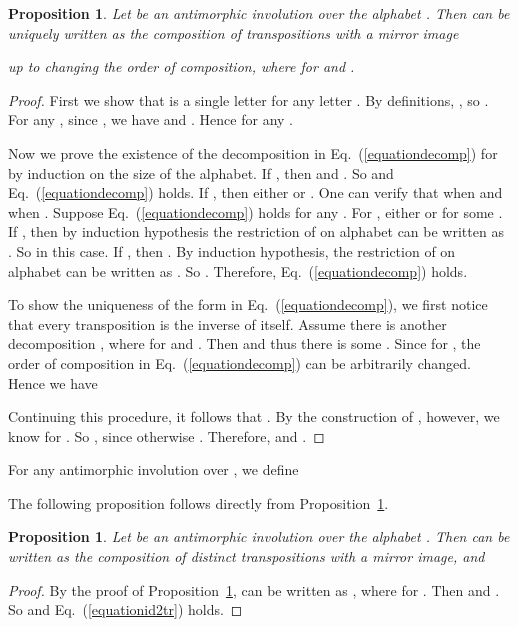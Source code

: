\documentclass[12pt]{article}
\newtheorem{proposition}[theorem]{Proposition}
\begin{document}
\begin{proposition}\label{prop:decomposition}
Let  be an antimorphic involution over the alphabet
. Then  can be uniquely written as the composition
of transpositions with a mirror image

up to changing the order of composition, where  for
 and .
\end{proposition}
\begin{proof}
First we show that  is a single letter for any letter
. By definitions, , so . For
any , since , we have
 and . Hence
 for any .

Now we prove the existence of the decomposition in
Eq.~(\ref{equationdecomp}) for  by induction on the size of
the alphabet. If , then  and
. So  and
Eq.~(\ref{equationdecomp}) holds. If , then either
 or . One can verify that
 when  and
 when .
Suppose Eq.~(\ref{equationdecomp}) holds for any .
For , either  or
 for some . If
, then by induction hypothesis the restriction
of  on alphabet  can be written as
. So
 in this
case. If , then . By induction
hypothesis, the restriction of  on alphabet
 can be written as
. So
.
Therefore, Eq.~(\ref{equationdecomp}) holds.

To show the uniqueness of the form in Eq.~(\ref{equationdecomp}), we
first notice that every transposition is the inverse of itself.
Assume there is another decomposition
,
where  for  and . Then
 and thus there is some .
Since  for , the order of composition in
Eq.~(\ref{equationdecomp}) can be arbitrarily changed. Hence we have

Continuing this procedure, it follows that
. By
the construction of , however, we know  for
. So , since otherwise .
Therefore,  and
.
\end{proof}


For any antimorphic involution  over , we define
  
The following proposition follows directly from
Proposition~\ref{prop:decomposition}.


\begin{proposition}\label{prop:id+2tr=absigma}
Let  be an antimorphic involution over the alphabet
. Then  can be written as the composition of
 distinct transpositions with a mirror image, and

\end{proposition}
\begin{proof}
By the proof of Proposition~\ref{prop:decomposition},  can
be written as
,
where  for . Then
 and
. So 
and Eq.~(\ref{equationid2tr}) holds.
\end{proof}
\end{document}
